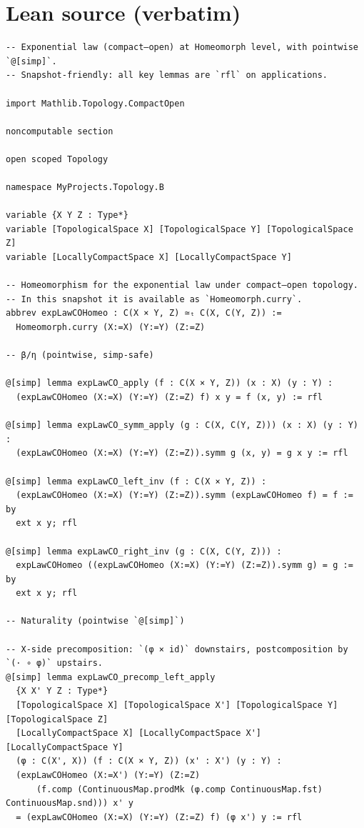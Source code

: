 \documentclass[12pt]{article}
\begin{document}
\section*{Lean source (verbatim)}
\begin{lstlisting}
-- Exponential law (compact–open) at Homeomorph level, with pointwise `@[simp]`.
-- Snapshot-friendly: all key lemmas are `rfl` on applications.

import Mathlib.Topology.CompactOpen

noncomputable section

open scoped Topology

namespace MyProjects.Topology.B

variable {X Y Z : Type*}
variable [TopologicalSpace X] [TopologicalSpace Y] [TopologicalSpace Z]
variable [LocallyCompactSpace X] [LocallyCompactSpace Y]

-- Homeomorphism for the exponential law under compact–open topology.
-- In this snapshot it is available as `Homeomorph.curry`.
abbrev expLawCOHomeo : C(X × Y, Z) ≃ₜ C(X, C(Y, Z)) :=
  Homeomorph.curry (X:=X) (Y:=Y) (Z:=Z)

-- β/η (pointwise, simp-safe)

@[simp] lemma expLawCO_apply (f : C(X × Y, Z)) (x : X) (y : Y) :
  (expLawCOHomeo (X:=X) (Y:=Y) (Z:=Z) f) x y = f (x, y) := rfl

@[simp] lemma expLawCO_symm_apply (g : C(X, C(Y, Z))) (x : X) (y : Y) :
  (expLawCOHomeo (X:=X) (Y:=Y) (Z:=Z)).symm g (x, y) = g x y := rfl

@[simp] lemma expLawCO_left_inv (f : C(X × Y, Z)) :
  (expLawCOHomeo (X:=X) (Y:=Y) (Z:=Z)).symm (expLawCOHomeo f) = f := by
  ext x y; rfl

@[simp] lemma expLawCO_right_inv (g : C(X, C(Y, Z))) :
  expLawCOHomeo ((expLawCOHomeo (X:=X) (Y:=Y) (Z:=Z)).symm g) = g := by
  ext x y; rfl

-- Naturality (pointwise `@[simp]`)

-- X-side precomposition: `(φ × id)` downstairs, postcomposition by `(· ∘ φ)` upstairs.
@[simp] lemma expLawCO_precomp_left_apply
  {X X' Y Z : Type*}
  [TopologicalSpace X] [TopologicalSpace X'] [TopologicalSpace Y] [TopologicalSpace Z]
  [LocallyCompactSpace X] [LocallyCompactSpace X'] [LocallyCompactSpace Y]
  (φ : C(X', X)) (f : C(X × Y, Z)) (x' : X') (y : Y) :
  (expLawCOHomeo (X:=X') (Y:=Y) (Z:=Z)
      (f.comp (ContinuousMap.prodMk (φ.comp ContinuousMap.fst) ContinuousMap.snd))) x' y
  = (expLawCOHomeo (X:=X) (Y:=Y) (Z:=Z) f) (φ x') y := rfl


\end{lstlisting}
\end{document}
